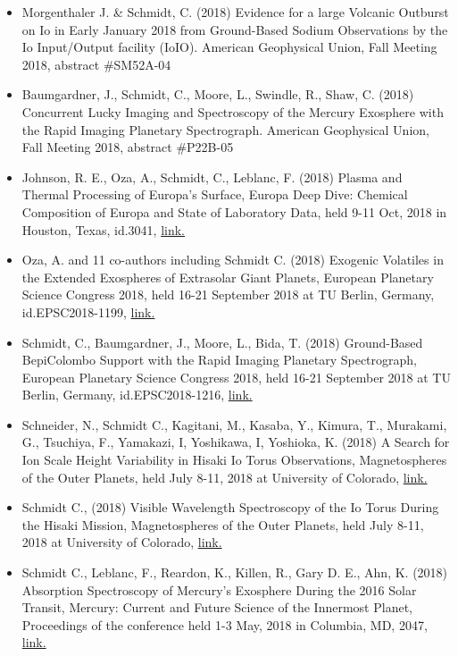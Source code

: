 \documentclass[12pt]{report}
\begin{document}
\begin{itemize}
   \item Morgenthaler J. \& Schmidt, C. (2018) Evidence for a large Volcanic Outburst on Io in Early January 2018 from Ground-Based Sodium Observations by the Io Input/Output facility (IoIO). American Geophysical Union, Fall Meeting 2018, abstract \#SM52A-04
   \item Baumgardner, J., Schmidt, C., Moore, L., Swindle, R., Shaw, C. (2018) Concurrent Lucky Imaging and Spectroscopy of the Mercury Exosphere with the Rapid Imaging Planetary Spectrograph. American Geophysical Union, Fall Meeting 2018, abstract \#P22B-05
   \item Johnson, R. E., Oza, A., Schmidt, C., Leblanc, F. (2018) Plasma and Thermal Processing of Europa's Surface, Europa Deep Dive: Chemical Composition of Europa and State of Laboratory Data, held 9-11 Oct, 2018 in Houston, Texas, id.3041, \href{https://www.hou.usra.edu/meetings/europadeepdive2018/pdf/3041.pdf}{link.} 
   \item Oza, A. and 11 co-authors including Schmidt C. (2018) Exogenic Volatiles in the Extended Exospheres of Extrasolar Giant Planets, European Planetary Science Congress 2018, held 16-21 September 2018 at TU Berlin, Germany, id.EPSC2018-1199, \href{https://meetingorganizer.copernicus.org/EPSC2018/EPSC2018-1199-2.pdf}{link.} 
   \item Schmidt, C., Baumgardner, J., Moore, L., Bida, T. (2018) Ground-Based BepiColombo Support with the Rapid Imaging Planetary Spectrograph, European Planetary Science Congress 2018, held 16-21 September 2018 at TU Berlin, Germany, id.EPSC2018-1216, \href{https://meetingorganizer.copernicus.org/EPSC2018/EPSC2018-1216-2.pdf}{link.} 
   \item Schneider, N., Schmidt C., Kagitani, M., Kasaba, Y., Kimura, T., Murakami, G., Tsuchiya, F., Yamakazi, I, Yoshikawa, I, Yoshioka, K. (2018) A Search for Ion Scale Height Variability in Hisaki Io Torus Observations, Magnetospheres of the Outer Planets, held July 8-11, 2018 at University of Colorado, \href{https://lasp.colorado.edu/home/mop/files/2018/07/Mop2018-Program-Online-PDF-A-Version-No-Covers.pdf/}{link.} 
   \item Schmidt C., (2018) Visible Wavelength Spectroscopy of the Io Torus During the Hisaki Mission, Magnetospheres of the Outer Planets, held July 8-11, 2018 at University of Colorado, \href{https://lasp.colorado.edu/home/mop/files/2018/07/Mop2018-Program-Online-PDF-A-Version-No-Covers.pdf/}{link.} 
   \item Schmidt C., Leblanc, F., Reardon, K., Killen, R., Gary D. E., Ahn, K. (2018) Absorption Spectroscopy of Mercury's Exosphere During the 2016 Solar Transit, Mercury: Current and Future Science of the Innermost Planet, Proceedings of the conference held 1-3 May, 2018 in Columbia, MD, 2047, \href{https://www.hou.usra.edu/meetings/mercury2018/pdf/6022.pdf}{link.} 

\end{itemize}
\end{document}
